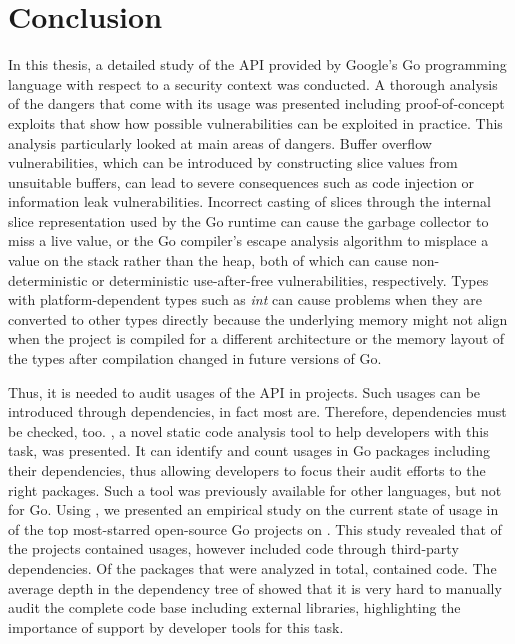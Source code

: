 
\chapter{Conclusion}\label{ch:conclusion}

In this thesis, a detailed study of the \unsafe{} \acrshort{API} provided by Google's Go programming language with
respect to a security context was conducted.
A thorough analysis of the dangers that come with its usage was presented including proof-of-concept exploits that show
how possible vulnerabilities can be exploited in practice.
This analysis particularly looked at  main areas of dangers.
Buffer overflow vulnerabilities, which can be introduced by constructing slice values from unsuitable buffers, can lead
to severe consequences such as code injection or information leak vulnerabilities.
Incorrect casting of slices through the internal slice representation used by the Go runtime can cause the garbage
collector to miss a live value, or the Go compiler's escape analysis algorithm to misplace a value on the stack rather
than the heap, both of which can cause non-deterministic or deterministic use-after-free vulnerabilities, respectively.
Types with platform-dependent types such as \textit{int} can cause problems when they are converted to other types
directly because the underlying memory might not align when the project is compiled for a different architecture or
the memory layout of the types after compilation changed in future versions of Go.

Thus, it is needed to audit usages of the \unsafe{} API in projects.
Such usages can be introduced through dependencies, in fact most are.
Therefore, dependencies must be checked, too.
\toolGeiger{}, a novel static code analysis tool to help developers with this task, was presented.
It can identify and count \unsafe{} usages in Go packages including their dependencies, thus allowing developers to
focus their audit efforts to the right packages.
Such a tool was previously available for other languages, but not for Go.
Using \toolGeiger{}, we presented an empirical study on the current state of \unsafe{} usage in \projsAnalyzed{} of the
top \projsTotal{} most-starred open-source Go projects on \github{}.
This study revealed that \percentageUnsafeProjects{} of the projects contained \unsafe{} usages, however
\percentageUnsafeTransitiveWithDependencies{} included \unsafe{} code through third-party dependencies.
Of the \packagesAnalyzed{} packages that were analyzed in total, \percentageUnsafePackages{} contained \unsafe{} code.
The average depth in the dependency tree of \averageUnsafeImportDepth{} showed that it is very hard to manually audit
the complete code base including external libraries, highlighting the importance of support by developer tools for this
task.

